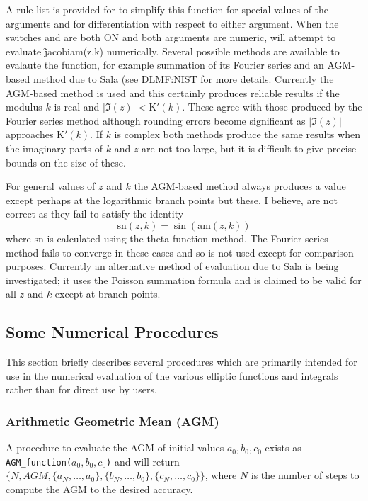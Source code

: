 A rule list is provided for to simplify this function for special values of the
arguments and for differentiation with respect to either argument.
When the switches  and  are both ON and both arguments
are numeric, \REDUCE will attempt to evaluate \f{jacobiam(z,k)} numerically.
Several possible methods are available to
evalaute the function, for example summation of its Fourier series and an
AGM-based method due to Sala (see \href{https://dlmf.nist.gov/22.20#vi}
{DLMF:NIST} for more details.
Currently the AGM-based method is used and this certainly produces reliable
results if the modulus $k$ is real and $|\Im(z)| < \mathrm{K}'(k)$. These
agree with those produced by the Fourier series method although rounding errors
become significant as $|\Im(z)|$ approaches $\mathrm{K}'(k)$.  If $k$ is complex
both methods produce the same results when the imaginary parts of $k$ and $z$
are not too large, but it is difficult to give precise bounds on the size of
these.

For general values of $z$ and $k$ the AGM-based method always produces a value
except perhaps at the logarithmic branch points but these, I believe, are
not correct as they fail to satisfy the identity
\[\mathrm{sn}(z,k) = \sin(\mathrm{am}(z,k)) \]
where $\mathrm{sn}$ is calculated using the theta function method. The Fourier
series method fails to converge in these cases and so is not used except for
comparison purposes.  Currently an alternative method of evaluation due to
Sala is being investigated; it uses the Poisson summation formula and is claimed
to be valid for all $z$ and $k$ except at branch points.

\subsection{Some Numerical Procedures}
This section briefly describes several procedures which are primarily
intended for use in the numerical evaluation of the various elliptic
functions and integrals rather than for direct use by users.

\subsubsection{Arithmetic Geometric Mean (AGM)}
\hypertarget{operator:AGM_FUNCTION}{}
A procedure to evaluate the AGM of initial values \(a_0,b_0,c_0\)
exists as \\
\texttt{AGM\_function(\(a_0,b_0,c_0\))} and will return \\
$\{ N, AGM, \{ a_N, \ldots ,a_0\}, \{ b_N, \ldots ,b_0\},
\{c_N, \ldots ,c_0\}\}$,
where $N$ is the number of steps to compute the AGM to the
desired accuracy.

